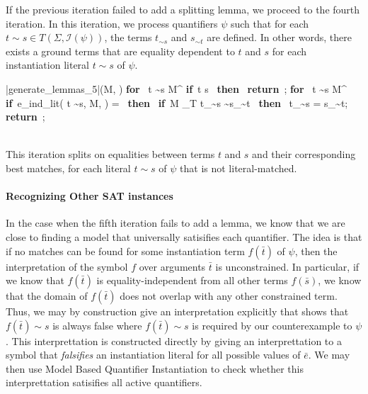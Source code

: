 \documentclass{llncs}
\def\IF{\qtab\keyword{if}\ }
\def\THEN{\ \keyword{then}\ }
\def\FI{\untab}
\def\RETURN{\keyword{return}\ }
\def\ENDPROC{\untab}
\def\DOFOR{\qtab\keyword{for}\ }
\def\ENDFOR{\untab}
\def\keyword#1{\mbox{\normalshape\bf #1}}
\begin{document}
If the previous iteration failed to add a splitting lemma, we proceed to the fourth iteration.
In this iteration, we process quantifiers $\psi$ such that for each $t \sim s \in T( \Sigma, \mathcal{I}( \psi ) )$, the terms $t_{\sim s}$ and $s_{\sim t}$ are defined.
In other words, there exists a ground terms that are equality dependent to $t$ and $s$ for each instantiation literal $t \sim s$ of $\psi$.

\begin{minipage}[t]{.4\linewidth}
\begin{program}
\PROC |generate\_lemmas\_5|(M, \psi) \BODY
  \DOFOR {} t \sim s \in M^\psi
    \IF t  s  \THEN
      \RETURN;
    \FI
  \ENDFOR
  \DOFOR {} t \sim s \in M^\psi
    \IF e\_ind\_lit( t \sim s, M, \psi ) = \emptyset \THEN
      \IF M \not\models_T t_{\sim s} \sim s_{\sim t} \THEN
         t_{\sim s} = s_{\sim t};
      \FI
    \FI
  \ENDFOR
  \RETURN;
\ENDPROC
\end{program}
\end{minipage}

\ \\

This iteration splits on equalities between terms $t$ and $s$ and their corresponding best matches, for each literal $t \sim s$ of $\psi$ that is not literal-matched.

\paragraph{Recognizing Other SAT instances}

In the case when the fifth iteration fails to add a lemma, we know that we are close to finding a model that universally satisifies each quantifier.
The idea is that if no matches can be found for some instantiation term $f( \bar{t} )$ of $\psi$, then the interpretation of the symbol $f$ over arguments $\bar{t}$ is unconstrained.
In particular, if we know that $f( \bar{t} )$ is equality-independent from all other terms $f( \bar{ s } )$, we know that the domain of $f( \bar{t} )$ does not overlap with any other constrained term.
Thus, we may by construction give an interpretation explicitly that shows that $f( \bar{ t } ) \sim s$ is always false where $f( \bar{t} ) \sim s$ is required by our counterexample to $\psi$. 
This interprettation is constructed directly by giving an interprettation to a symbol that \emph{falsifies} an instantiation literal for all possible values of $\bar{e}$.
We may then use Model Based Quantifier Instantiation to check whether this interprettation satisifies all active quantifiers.
\end{document}
